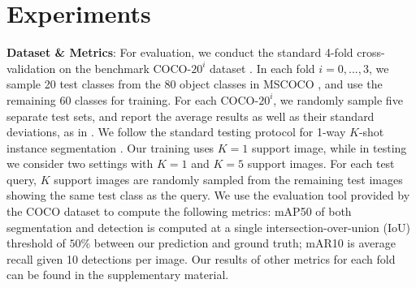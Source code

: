 \documentclass[final]{cvpr}
\begin{document}




\section{Experiments}
\label{sec:experiments}

\textbf{Dataset \& Metrics}: For evaluation, we conduct the standard 4-fold cross-validation on the benchmark COCO-$20^i$ dataset \cite{michaelis2018one}. In each fold $i=0,...,3$, we sample 20  test classes from the 80 object classes in MSCOCO \cite{lin2014microsoft}, and use the remaining 60 classes for training. For each COCO-$20^i$, we randomly sample five separate test sets, and report the average results as well as their standard deviations, as in   \cite{michaelis2018one}.  We follow the standard testing protocol for 1-way $K$-shot instance segmentation  \cite{michaelis2018one}. Our training uses $K=1$ support image, while in testing we consider two settings with $K=1$ and $K=5$  support images. For each test query, $K$ support images are  randomly sampled from the remaining test images showing the same test class as the query. %
We use the evaluation tool provided by the COCO dataset to compute the following metrics:  mAP50 of both segmentation and detection is computed at a single intersection-over-union (IoU) threshold of $50\%$ between our prediction and ground truth; mAR10 is average recall given 10 detections per image.
Our results of other metrics for each fold can be found in the supplementary material.
\end{document}
